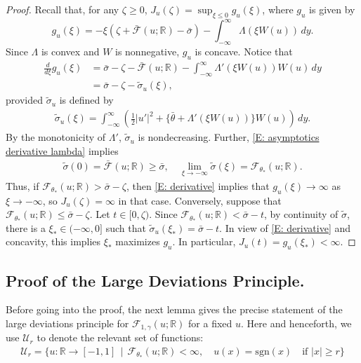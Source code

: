 \documentclass[10pt,a4paper]{amsart}
\begin{document}
\begin{proof} Recall that, for any $\zeta \geq 0$, $J_{u}(\zeta) = \sup_{\xi \leq 0} g_{u}(\xi)$, where $g_{u}$ is given by
    \begin{equation*}
        g_{u}(\xi) = - \xi ( \zeta + \bar{\mathscr{F}}(u;\mathbb{R}) - \bar{\sigma} ) - \int_{-\infty}^{\infty} \Lambda(\xi W(u) ) \, dy.
    \end{equation*}
Since $\Lambda$ is convex and $W$ is nonnegative, $g_{u}$ is concave.
Notice that 
    \begin{align} \label{E: derivative}
       \frac{d}{d\xi} g_{u}(\xi) &= \bar{\sigma} - \zeta - \bar{\mathscr{F}}(u;\mathbb{R}) - \int_{-\infty}^{\infty} \Lambda'(\xi W(u)) W(u) \, dy \\
        &= \bar{\sigma} - \zeta - \tilde{\sigma}_{u}(\xi), \nonumber
    \end{align}
provided $\tilde{\sigma}_{u}$ is defined by
    \begin{align*}
        \tilde{\sigma}_{u}(\xi) = \int_{-\infty}^{\infty} \left( \frac{1}{2} |u'|^{2} + \{ \bar{\theta} + \Lambda'(\xi W(u) ) \} W(u) \right) \, dy.
    \end{align*}   
By the monotonicity of $\Lambda'$, $\tilde{\sigma}_{u}$ is nondecreasing.  Further, \eqref{E: asymptotics derivative lambda} implies
			\begin{align*}
				 \tilde{\sigma}(0) = \bar{\mathscr{F}}(u;\mathbb{R}) \geq \bar{\sigma}, \quad \lim_{\xi \to -\infty} \tilde{\sigma}(\xi) = \mathscr{F}_{\theta_{*}}(u;\mathbb{R}).
			\end{align*}
        Thus, if $\mathscr{F}_{\theta_{*}}(u;\mathbb{R}) > \bar{\sigma} - \zeta$, then \eqref{E: derivative} implies that $g_{u}(\xi) \to \infty$ as $\xi \to -\infty$, so $J_{u}(\zeta) = \infty$ in that case.  Conversely, suppose that $\mathscr{F}_{\theta_{*}}(u;\mathbb{R}) \leq \bar{\sigma} - \zeta$.  Let $t \in [0,\zeta)$.  Since $\mathscr{F}_{\theta_{*}}(u;\mathbb{R}) < \bar{\sigma} - t$, by continuity of $\tilde{\sigma}$, there is a $\xi_{*} \in (-\infty,0]$ such that $\tilde{\sigma}_{u}(\xi_{*}) = \bar{\sigma} - t$.  In view of \eqref{E: derivative} and concavity, this implies $\xi_{*}$ maximizes $g_{u}$.  In particular, $J_{u}(t) = g_{u}(\xi_{*}) < \infty$.
\end{proof}

\subsection{Proof of the Large Deviations Principle.} Before going into the proof, the next lemma gives the precise statement of the large deviations principle for $\mathscr{F}_{1,\gamma}(u;\mathbb{R})$ for a fixed $u$.  Here and henceforth, we use $\mathcal{U}_{r}$ to denote the relevant set of functions:
	\begin{align*}
		\mathcal{U}_{r} = \{ u : \mathbb{R} \to [-1,1] \, \mid \, \mathscr{F}_{\theta_{*}}(u;\mathbb{R}) <\infty, \quad u(x) = \text{sgn}(x) \quad \text{if} \, \, |x| \geq r \}
	\end{align*}
\end{document}
